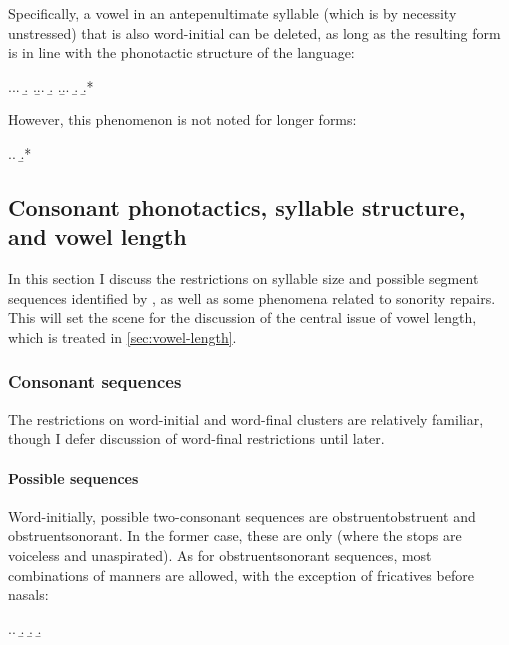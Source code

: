 Specifically, a vowel in an antepenultimate syllable (which is by necessity unstressed) that is also word-initial can be deleted, as long as the resulting form is in line with the phonotactic structure of the language:

\ex.\label{ex:pw-antepenult-deletion}\a.\a.
\b.
\z.\b.\a.
\b.
\z.\b.\a.
\b.
\b.*\mbi{[ˈrdaːloð]}

However, this phenomenon is not noted for longer forms:

\ex.\a.
\b.*\mbi{[niˈveiljed]}


\subsection{Consonant phonotactics, syllable structure, and vowel length}
\label{sec:phonotactics-1}

In this section I discuss the restrictions on syllable size and possible segment sequences identified by \citet{awbery86:_pembr_welsh}, as well as some phenomena related to sonority repairs. This will set the scene for the discussion of the central issue of vowel length, which is treated in \cref{sec:vowel-length}.

\subsubsection{Consonant sequences}
\label{sec:consonant-sequences-1}

The restrictions on word-initial and word-final clusters are relatively familiar, though I defer discussion of word-final restrictions until later.

\paragraph{Possible sequences}
\label{sec:possible-sequences}

Word-initially,  possible two-consonant sequences are obstruent\endash obstruent and obstruent\endash sonorant. In the former case, these are only \ipa{[sk~st~sp]} (where the stops are voiceless and unaspirated). As for obstruent\endash sonorant sequences, most combinations of manners are allowed, with the exception of fricatives before nasals:

\ex.\a.
\b.
\b.
\b.

